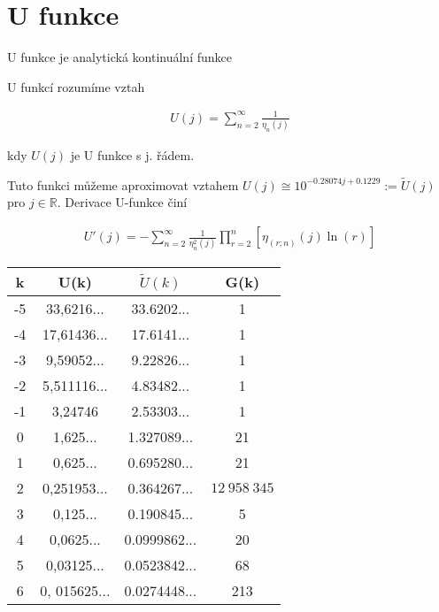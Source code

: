 \section{U funkce}

U funkce je analytická kontinuální funkce 

\begin{definition}[U funkce]
      U funkcí rozumíme vztah
      
      \begin{align}
            U(j) = \sum_{n=2}^{\infty} \frac{1}{\eta_n(j)}
      \end{align}
      
      kdy \(U(j)\) je U funkce s j. řádem.
\end{definition}

Tuto funkci můžeme aproximovat vztahem \(U(j) 
\cong 10^{-0.28074j + 0.1229} := \tilde{U}(j)\) 
pro \(j \in \mathbb{R}\). Derivace U-funkce činí

\begin{align}
      U'(j) = - \sum_{n=2}^\infty \frac{1}{\eta^2_n(j)}
      \prod_{r=2}^n \left[\eta_{(r; n)}(j) \ln(r) \right]
\end{align}

\begin{table}[h!]
      \centering
      \begin{tabular}{||c c c c||} 
            \hline
            k & U(k) & \(\tilde{U}(k)\) & G(k) \\ [0.5ex] 
            \hline\hline
            -5 & 33,6216... & 33.6202...& 1  \\
            -4 & 17,61436...& 17.6141... & 1 \\
            -3 & 9,59052... & 9.22826... & 1 \\
            -2 & 5,511116... & 4.83482... & 1 \\
            -1 & 3,24746 & 2.53303... & 1 \\
            0  & 1,625...  & 1.327089... & 21  \\
            1 & 0,625... & 0.695280... & 21 \\
            2  & 0,251953...  & 0.364267... & \(12 \ 958 \ 345\)  \\
            3 & 0,125... & 0.190845... & 5 \\
            4  & 0,0625... & 0.0999862...  & 20  \\
            5  & 0,03125... & 0.0523842... & 68  \\
            6  & 0, 015625... & 0.0274448...  & 213  \\ [1ex] 
            \hline
      \end{tabular}
\end{table}

